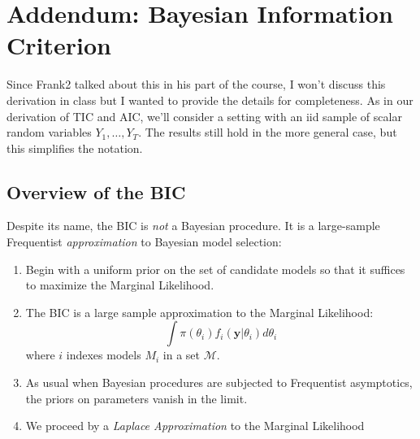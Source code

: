 \documentclass[12pt]{article}
\theoremstyle{definition}
\begin{document}
\section*{Addendum: Bayesian Information Criterion}
Since Frank2 talked about this in his part of the course, I won't discuss this derivation in class but I wanted to provide the details for completeness. As in our derivation of TIC and AIC, we'll consider a setting with an iid sample of scalar random variables $Y_1, \hdots, Y_T$. The results still hold in the more general case, but this simplifies the notation. 

\subsection{Overview of the BIC}
Despite its name, the BIC is \emph{not} a Bayesian procedure. It is a large-sample Frequentist \emph{approximation} to Bayesian model selection:
	\begin{enumerate}
		\item Begin with a uniform prior on the set of candidate models so that it suffices to maximize the Marginal Likelihood.
		\item The BIC is a large sample approximation to the Marginal Likelihood:
		$$\int \pi(\theta_i)f_i(\mathbf{y}|\theta_i)d\theta_i$$
		where $i$ indexes models $M_i$ in a set $\mathcal{M}$.
		\item As usual when Bayesian procedures are subjected to Frequentist asymptotics, the priors on parameters vanish in the limit.
		\item We proceed by a \emph{Laplace Approximation} to the Marginal Likelihood
	\end{enumerate}
\end{document}
